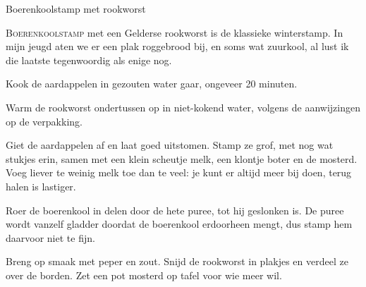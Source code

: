 \begin{recipe}{Boerenkoolstamp met rookworst}


\lettrine{B}{oerenkoolstamp} met een Gelderse rookworst is de klassieke
winterstamp. In mijn jeugd aten we er een plak roggebrood bij, en soms wat
zuurkool, al lust ik die laatste tegenwoordig als enige nog.

\begin{ingredients}
\end{ingredients}

\begin{steps}
  \item Kook de aardappelen in gezouten water gaar, ongeveer 20 minuten.
  \item Warm de rookworst ondertussen op in niet-kokend water, volgens de
        aanwijzingen op de verpakking.
  \item Giet de aardappelen af en laat goed uitstomen. Stamp ze grof, met
        nog wat stukjes erin, samen met een klein scheutje melk, een
        klontje boter en de mosterd. Voeg liever te weinig melk toe dan te
        veel: je kunt er altijd meer bij doen, terug halen is lastiger.
  \item Roer de boerenkool in delen door de hete puree, tot hij geslonken
        is. De puree wordt vanzelf gladder doordat de boerenkool erdoorheen
        mengt, dus stamp hem daarvoor niet te fijn.
  \item Breng op smaak met peper en zout. Snijd de rookworst in plakjes
        en verdeel ze over de borden. Zet een pot mosterd op tafel voor
        wie meer wil.
\end{steps}
\end{recipe}
